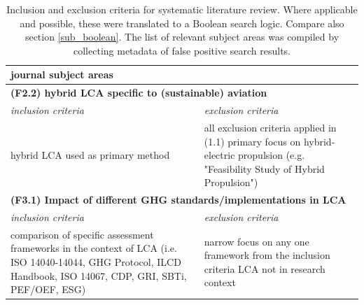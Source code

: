 \documentclass{article}
\begin{document}
\begin{table}[H]
\begin{tabularx}{\textwidth}{| X | X |}
                        journal subject areas
                    \\
                    \hline
                \multicolumn{2}{|l|}{\textbf{(F2.2) hybrid LCA specific to (sustainable) aviation}}  \\
                    \hline
                    \textit{inclusion criteria} & \textit{exclusion criteria} \\
                    \hline
                        hybrid LCA used as primary method  \newline
                    &
                        all exclusion criteria applied in (1.1) \newline
                        primary focus on hybrid-electric propulsion \newline
                        (e.g. "Feasibility Study of Hybrid Propulsion")
                    \\
                    \hline
                \multicolumn{2}{|l|}{\textbf{(F3.1) Impact of different GHG standards/implementations in LCA}}  \\
                    \hline
                    \textit{inclusion criteria} & \textit{exclusion criteria} \\
                    \hline
                        comparison of specific assessment frameworks in the context of LCA\newline
                        (i.e. ISO 14040-14044, GHG Protocol, ILCD Handbook, ISO 14067, CDP, GRI, SBTi, PEF/OEF, ESG)
                    &
                        narrow focus on any one framework from the inclusion criteria \newline
                        LCA not in research context
                    \\
                    \hline
                \end{tabularx}
                \caption{Inclusion and exclusion criteria for systematic literature review. Where applicable and possible, these were translated to a Boolean search logic. Compare also section \ref{sub_boolean}. The list of relevant subject areas was compiled by collecting metadata of false positive search results.}
                \label{tab_inclusion_exclusion}
            \end{table}
    
\newpage


\end{document}
